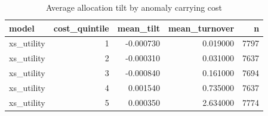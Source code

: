 \begin{table}
\caption{Average allocation tilt by anomaly carrying cost}
\label{tab:t8_tilt_by_cost}
\begin{tabular}{lrrrr}
\toprule
model & cost\_quintile & mean\_tilt & mean\_turnover & n \\
\midrule
xs\_utility & 1 & -0.000730 & 0.019000 & 7797 \\
xs\_utility & 2 & -0.000310 & 0.031000 & 7637 \\
xs\_utility & 3 & -0.000840 & 0.161000 & 7694 \\
xs\_utility & 4 & 0.001540 & 0.735000 & 7637 \\
xs\_utility & 5 & 0.000350 & 2.634000 & 7774 \\
\bottomrule
\end{tabular}
\end{table}
